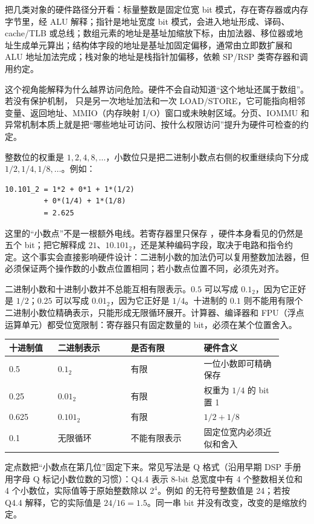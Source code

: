 把几类对象的硬件路径分开看：标量整数是固定位宽 bit 模式，存在寄存器或内存字节里，经 ALU 解释；指针是地址宽度 bit 模式，会进入地址形成、译码、cache/TLB 或总线；数组元素的地址是基址加缩放下标，由加法器、移位器或地址生成单元算出；结构体字段的地址是基址加固定偏移，通常由立即数扩展和 ALU 地址加法完成；栈对象的地址是栈指针加偏移，依赖 SP/RSP 类寄存器和调用约定。

这个视角能解释为什么越界访问危险。硬件不会自动知道“这个地址还属于数组”。若没有保护机制， 只是另一次地址加法和一次 LOAD/STORE，它可能指向相邻变量、返回地址、MMIO（内存映射 I/O）窗口或未映射区域。分页、IOMMU 和异常机制本质上就是把“哪些地址可访问、按什么权限访问”提升为硬件可检查的约定。

整数位的权重是 $1,2,4,8,\ldots$，小数位只是把二进制小数点右侧的权重继续向下分成 $1/2,1/4,1/8,\ldots$。例如：

\begin{lstlisting}
10.101_2 = 1*2 + 0*1 + 1*(1/2)
         + 0*(1/4) + 1*(1/8)
         = 2.625
\end{lstlisting}

这里的“小数点”不是一根额外电线。若寄存器里只保存 ，硬件本身看见的仍然是五个 bit；把它解释成 $21$、$10.101_2$，还是某种编码字段，取决于电路和指令约定。这个事实会直接影响硬件设计：二进制小数的加法仍可以复用整数加法器，但必须保证两个操作数的小数点位置相同；若小数点位置不同，必须先对齐。

二进制小数和十进制小数并不总能互相有限表示。$0.5$ 可以写成 $0.1_2$，因为它正好是 $1/2$；$0.25$ 可以写成 $0.01_2$，因为它正好是 $1/4$。十进制的 $0.1$ 则不能用有限个二进制小数位精确表示，只能形成无限循环展开。计算器、编译器和 FPU（浮点运算单元）都受位宽限制：寄存器只有固定数量的 bit，必须在某个位置舍入。

\begin{longtable}{L{0.16\linewidth}L{0.24\linewidth}L{0.24\linewidth}L{0.26\linewidth}}
\toprule
十进制值 & 二进制表示 & 是否有限 & 硬件含义 \\
 & $0.1_2$ & 有限 & 一位小数即可精确保存 \\
0.25 & $0.01_2$ & 有限 & 权重为 $1/4$ 的 bit 置 1 \\
0.625 & $0.101_2$ & 有限 & $1/2+1/8$ \\
0.1 & 无限循环 & 不能有限表示 & 固定位宽内必须近似和舍入 \\
\bottomrule
\end{longtable}

定点数把“小数点在第几位”固定下来。常见写法是 Q 格式（沿用早期 DSP 手册用字母 Q 标记小数位数的习惯）：Q4.4 表示 8-bit 总宽度中有 4 个整数相关位和 4 个小数位，实际值等于原始整数除以 $2^4$。例如  的无符号整数值是 24；若按 Q4.4 解释，它的实际值是 $24/16=1.5$。同一串 bit 并没有改变，改变的是缩放约定。

